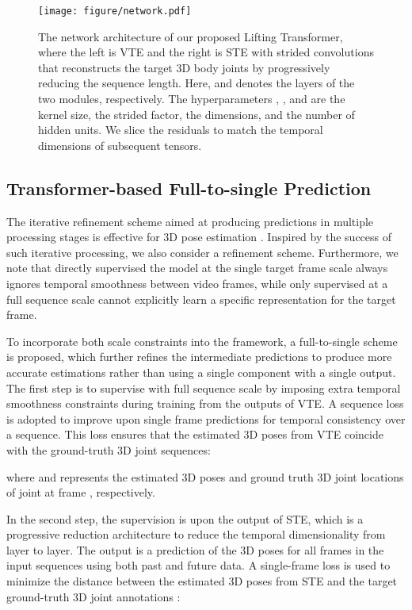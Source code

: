 \documentclass[10pt,twocolumn,letterpaper]{article}
\begin{document}
\begin{figure}[t]
	\centering
	\texttt{[image: figure/network.pdf]}
	\caption
	{
      The network architecture of our proposed Lifting Transformer, where the left is VTE and the right is STE with strided convolutions that reconstructs the target 3D body joints by progressively reducing the sequence length. 
      Here,  and  denotes the layers of the two modules, respectively. 
      The hyperparameters , ,  and  are the kernel size, the strided factor, the dimensions, and the number of hidden units. 
      We slice the residuals to match the temporal dimensions of subsequent tensors. 
	}
	\label{fig:network}
\end{figure}

\subsection{Transformer-based Full-to-single Prediction}
The iterative refinement scheme aimed at producing predictions in multiple processing stages is effective for 3D pose estimation \cite{pavlakos2017coarse,cai2019exploiting}. 
Inspired by the success of such iterative processing, we also consider a refinement scheme. 
Furthermore, we note that directly supervised the model at the single target frame scale always ignores temporal smoothness between video frames, while only supervised at a full sequence scale cannot explicitly learn a specific representation for the target frame. 

To incorporate both scale constraints into the framework, a full-to-single scheme is proposed, which further refines the intermediate predictions to produce more accurate estimations rather than using a single component with a single output. 
The first step is to supervise with full sequence scale by imposing extra temporal smoothness constraints during training from the outputs of VTE. 
A sequence loss  is adopted to improve upon single frame predictions for temporal consistency over a sequence. 
This loss ensures that the estimated 3D poses from VTE coincide with the ground-truth 3D joint sequences: 

where  and  represents the estimated 3D poses and ground truth 3D joint locations of joint  at frame , respectively. 

In the second step, the supervision is upon the output of STE, which is a progressive reduction architecture to reduce the temporal dimensionality from layer to layer. 
The output is a prediction of the 3D poses for all frames in the input sequences using both past and future data. 
A single-frame loss  is used to minimize the distance between the estimated 3D poses  from STE and the target ground-truth 3D joint annotations : 
\end{document}
